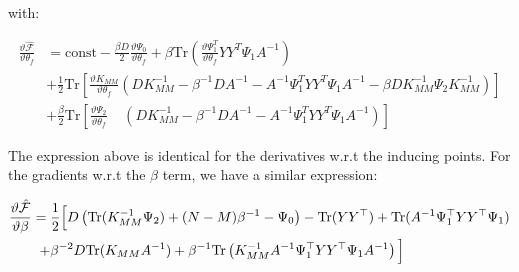   with:

\begin{align}
\frac{\vartheta \hat{\mathcal{F}}}{\vartheta \theta_f} {}& = \text{const} - 
\frac{\beta D}{2} \frac{\vartheta \Psi_0}{\vartheta \theta_f}
 + \beta \text{Tr} \left(\frac{\vartheta \Psi_1^T}{\vartheta \theta_f} Y Y^T \Psi_1 A^{-1} \right) \nonumber \\
{}& + \frac{1}{2} \text{Tr} \left[ \frac{\vartheta K_{MM}}{\vartheta \theta_f}
        \left(
	   D K_{MM}^{-1} - \beta^{-1} D A^{-1} - A^{-1} \Psi_1^T Y Y^T \Psi_1 A^{-1} - \beta D K_{MM}^{-1} \Psi_2 K_{MM}^{-1} 
         \right) \right] \nonumber \\
{}& + \frac{\beta}{2} \text{Tr} \left[ \frac{\vartheta \Psi_2}{\vartheta \theta_f} \;\;\;\;
       \left(
	  D K_{MM}^{-1} - \beta^{-1} D A^{-1} - A^{-1} \Psi_1^T Y Y^T \Psi_1 A^{-1}
       \right) \right] \label{DerivativeOfFtildeComplete}
\end{align}

The expression above is identical for the derivatives w.r.t the inducing points.
For the gradients w.r.t the $\beta$ term, we have a similar expression:



\begin{align}
\frac{\vartheta \hat{\mathcal{F}}}{\vartheta \beta} ={}&
  \frac{1}{2} \Big[ 
      D \left( \text{Tr}(K_{MM}^{-1} \Psi_2) + (N-M)\beta^{-1} - \Psi_0 \right) - \text{Tr}(Y Y^{\top})
	  + \text{Tr}(A^{-1}\Psi_1^{\top} Y Y^{\top} \Psi_1) \nonumber \\
   +{}& \beta^{-2} D \text{Tr} ( K_{MM} A^{-1} ) + \beta^{-1} \text{Tr} \left( K_{MM}^{-1} A^{-1} \Psi_1^{\top} Y Y^{\top} \Psi_1 A^{-1} \right) \Big]
\label{derivb2}
\end{align}


